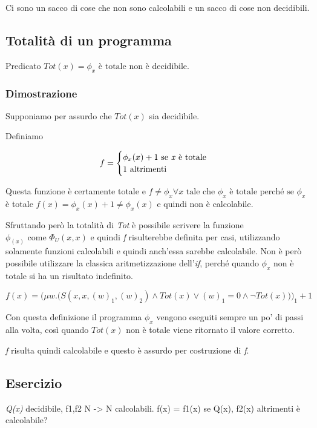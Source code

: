 Ci sono un sacco di cose che non sono calcolabili e un sacco di cose non decidibili.\\

\subsection{Totalità di un programma}

Predicato $ Tot(x) = \phi_x \text{ è totale} $ non è decidibile.

\subsubsection{Dimostrazione}

Supponiamo per assurdo che $ Tot(x) $ sia decidibile.

Definiamo

$$
f = \begin{cases}
\phi_x(x) +1 \text{ se \textit{x} è totale}\\
1 \text{ altrimenti}
\end{cases}
$$

Questa funzione è certamente totale e $ f \neq \phi_x \forall x \text{ tale che } \phi_x \text{ è totale perché se }\phi_x $ è totale $ f(x) = \phi_x(x)+1 \neq \phi_x(x) $ e quindi non è calcolabile.

Sfruttando però la totalità di \textit{Tot} è possibile scrivere la funzione $ \phi_(x) \text{ come } \Phi_U(x,x)$ e quindi \textit{f} risulterebbe definita per casi, utilizzando solamente funzioni calcolabili e quindi anch'essa sarebbe calcolabile.
Non è però possibile utilizzare la classica aritmetizzazione dell'\textit{if}, perché quando $ \phi_x $ non è totale si ha un risultato indefinito.

$$
f(x)= \bigg( \mu w. \Big( S(x,x,(w)_1, (w)_2) \wedge Tot(x) \vee (w)_1 = 0 \wedge \neg Tot(x) \Big) \bigg)_1 +1
$$

Con questa definizione il programma $ \phi_x $ vengono eseguiti sempre un po' di passi alla volta, così quando $ Tot(x) $ non è totale viene ritornato il valore corretto.

\textit{f} risulta quindi calcolabile e questo è assurdo per costruzione di \textit{f}.

\subsection{Esercizio}


\textit{Q(x)} decidibile, f1,f2 N -> N calcolabili.  f(x) = f1(x) se Q(x), f2(x) altrimenti è calcolabile?

